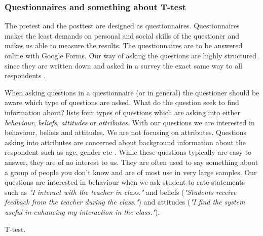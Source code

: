 \subsubsection{Questionnaires and something about T-test} %
The pretest and the posttest are designed as questionnaires. Questionnaires makes the least demands on personal and social skills of the questioner \cite[p.~74]{deacon2007researching} and makes us able to measure the results. The questionnaires are to be answered online with Google Forms. Our way of asking the questions are highly structured since they are written down and asked in a survey the exact same way to all respondents \cite[p.~65]{deacon2007researching}.

When asking questions in a questionnaire (or in general) the questioner should be aware which type of questions are asked. What do the question seek to find information about?  lists four types of questions which are asking into either \emph{behaviour}, \emph{beliefs}, \emph{attitudes} or \emph{attributes}. With our questions we are interested in behaviour, beliefs and attitudes. We are not focusing on attributes. Questions asking into attributes are concerned about background information about the respondent such as age, gender etc \cite[p.~75]{deacon2007researching}. While these questions typically are easy to answer, they are of no interest to us. They are often used to say something about a group of people you don't know and are of most use in very large samples. Our questions are interested in behaviour when we ask student to rate statements such as \emph{"I interact with the teacher in class."} and beliefs (\emph{"Students receive feedback from the teacher during the class."}) and attitudes (\emph{"I find the system useful in enhancing my interaction in the class."}).

T-test.










